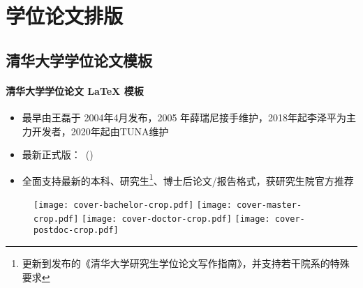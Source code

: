
\section{学位论文排版}
\subsection{\ThuThesis 清华大学学位论文模板}

\begin{frame}{\ThuThesis}
  \framesubtitle{清华大学学位论文 \LaTeX{} 模板}
  \begin{itemize}
  \item 最早由王磊于 2004年4月发布，2005 年薛瑞尼接手维护，2018年起李泽平为主力开发者，2020年起由TUNA维护
  \item 最新正式版：\ThuThesisVersion\ (\ThuThesisDate)
  \item 全面支持最新的本科、研究生\footnote{更新到\ThuThesisGuideVersion{}发布的《清华大学研究生学位论文写作指南》，并支持若干院系的特殊要求}、博士后论文/报告格式，获研究生院官方推荐 
  \end{itemize}
  \begin{figure}[htbp]
    \centering
    \texttt{[image: cover-bachelor-crop.pdf]}\hfill
    \texttt{[image: cover-master-crop.pdf]}\hfill
    \texttt{[image: cover-doctor-crop.pdf]}\hfill
    \texttt{[image: cover-postdoc-crop.pdf]}
  \end{figure}
\end{frame}

